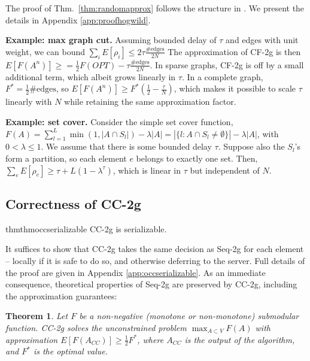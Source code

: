 \documentclass{article} %
\newcommand{\hogwild}{CF-2g}
\newcommand{\occ}{CC-2g}
\newcommand{\seqalg}{Seq-2g}
\newcommand{\occshort}{CC}
\newtheorem{thm}{Theorem}[section]
\newcommand{\thmref}[1]{Thm.~\ref{#1}}
\begin{document}
The proof of \thmref{thm:randomapprox} follows the structure in \cite{buchbinder2012}. We present the details in Appendix \ref{app:proofhogwild}.



\textbf{Example: max graph cut.}
Assuming bounded delay of $\tau$ and edges with unit weight, we can bound $\sum_i E[\rho_i] \leq 2\tau\frac{\text{\#edges}}{2N}$
The approximation of \hogwild{} is then $E[F(A^n)] \geq = \frac{1}{2} F(OPT) - \tau\frac{\#\text{edges}}{2N}$.
In sparse graphs, \hogwild{} is off by a small additional term, which albeit grows linearly in $\tau$.
In a complete graph, $F^* = \frac{1}{2}\#\text{edges}$, so $E[F(A^n)] \geq F^*\left(\frac{1}{2} - \frac{\tau}{N}\right)$, which makes it possible to scale $\tau$ linearly with $N$ while retaining the same approximation factor.


\textbf{Example: set cover.}
Consider the simple set cover function,
$F(A) = \sum_{l=1}^L \min(1,|A\cap S_l|) - \lambda|A| = |\{l: A\cap S_l \neq\emptyset\}| - \lambda|A|$,
with $0 < \lambda \leq 1$.
We assume that there is some bounded delay $\tau$.
Suppose also the $S_l$'s form a partition, so each element $e$ belongs to exactly one set.
Then, $\sum_e E[\rho_e] \geq \tau + L(1-\lambda^\tau)$, which is linear in $\tau$ but independent of $N$.



\subsection{Correctness of \occ{}}
\begin{restatable}{thm}{thmoccserializable} \occ{} is serializable.
\end{restatable}
It suffices to show that \occ{} takes the same decision as \seqalg{} for each element -- locally if it is safe to do so, and otherwise deferring to the server.
Full details of the proof are given in Appendix \ref{app:occserializable}.
As an immediate consequence, theoretical properties of \seqalg{} are preserved by \occ{}, including the approximation guarantees:

\begin{thm} Let $F$ be a non-negative (monotone or non-monotone) submodular function.
\occ{} solves the unconstrained problem $\max_{A\subset V} F(A)$ with approximation
$E[F(A_{\occshort{}})] \geq \frac{1}{2}F^*$,
where $A_{\occshort{}}$ is the output of the algorithm, and $F^*$ is the optimal value.
\end{thm}
\end{document}
